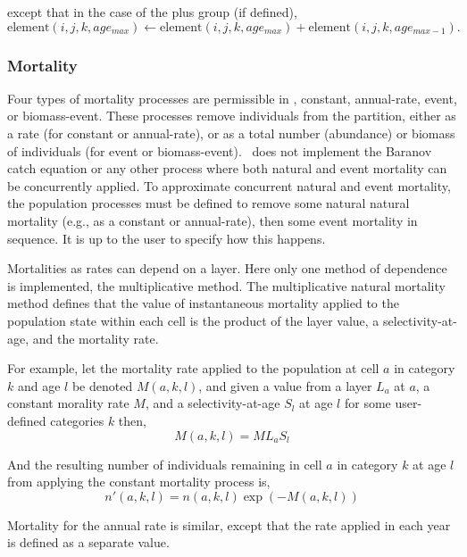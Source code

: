 except that in the case of the plus group (if defined), 
\begin{equation}
  \text{element}(i,j,k,age_{max}) \leftarrow \text{element}(i,j,k,age_{max}) + \text{element}(i,j,k,age_{max-1}).
\end{equation}

\subsubsection{Mortality\label{sec:mortality}}

Four types of mortality processes are permissible in \SPM, constant, annual-rate, event, or biomass-event. These processes remove individuals from the partition, either as a rate (for constant or annual-rate), or as a total number (abundance) or biomass of individuals (for event or biomass-event). \SPM\ does not implement the Baranov catch equation or any other process where both natural and event mortality can be concurrently applied. To approximate concurrent natural and event mortality, the population processes must be defined to remove some natural natural mortality (e.g., as a constant or annual-rate), then some event mortality in sequence. It is up to the user to specify how this happens.

Mortalities as rates can depend on a layer. Here only one method of dependence is implemented, the multiplicative method. The multiplicative natural mortality method defines that the value of instantaneous mortality applied to the population state within each cell is the product of the layer value, a selectivity-at-age, and the mortality rate. 

For example, let the mortality rate applied to the population at cell $a$ in category $k$ and age $l$ be denoted $M(a,k,l)$, and given a value from a layer $L_a$  at $a$, a constant morality rate $M$, and a selectivity-at-age $S_l$ at age $l$ for some user-defined categories $k$ then, 
\begin{equation}
  M(a,k,l) = ML_a S_l 
\end{equation}

And the resulting number of individuals remaining in cell $a$ in category $k$ at age $l$ from applying the constant mortality process is,
\begin{equation}
  n'(a,k,l) = n(a,k,l) \exp \left({-M(a,k,l)}\right)
\end{equation}

Mortality for the annual rate is similar, except that the rate applied in each year is defined as a separate value. 

